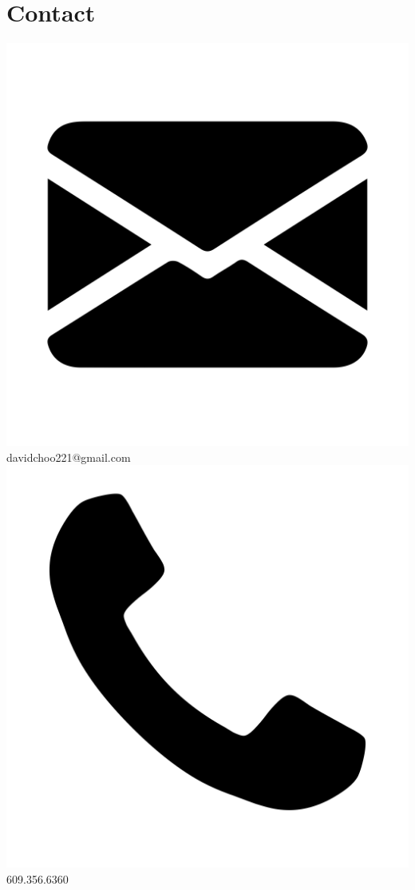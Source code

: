 \documentclass[9pt]{extarticle}
\begin{document}
\begin{minipage}[t]{.25\textwidth}
    \section{Contact}
    \large
    {\includegraphics[scale=0.02]{img/mail}}   davidchoo221@gmail.com
    \vspace{0.5em}\\
    {\includegraphics[scale=0.02]{img/phone}}  609.356.6360

\end{minipage}
\end{document}
